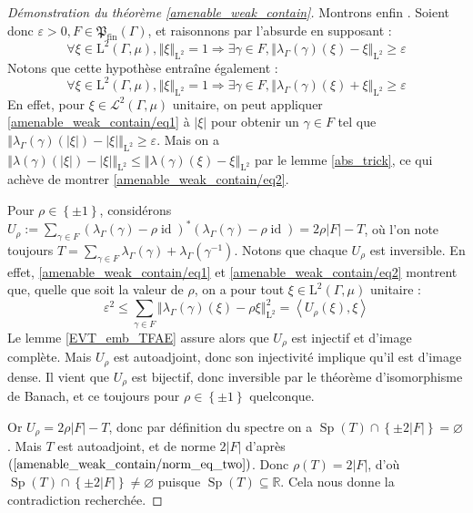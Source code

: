 \documentclass[a4paper,12pt]{article}
\newcommand{\R}{\mathbb{R}}
\newcommand{\norm}[1]{\left\Vert #1\right\Vert}
\newcommand{\abs}[1]{\left\vert#1\right\vert}
\newcommand{\card}[1]{\abs{#1}}
\newcommand{\ket}[1]{\left\langle #1 \right\rangle}
\newcommand{\set}[1]{\left\{ #1 \right\}}
\newcommand{\inv}{^{-1}}
\renewcommand{\implies}{\Rightarrow}
\newcommand{\finparts}{\mathfrak{P}_{\mathrm{fin}}}
\DeclareMathOperator{\id}{id}
\DeclareMathOperator{\Sp}{Sp}
\begin{document}
\begin{proof}[Démonstration du théorème \ref{amenable_weak_contain}]
    Montrons enfin \framebox{$(\ref{amenable_weak_contain/norm_eq_two})\implies(\ref{amenable_weak_contain/weak_almost_invariant})$}. Soient donc $\varepsilon>0, F\in\finparts(\Gamma)$, et 
    raisonnons par l'absurde en supposant :
    \begin{equation}\label{amenable_weak_contain/eq1}
        \forall\xi\in\mathrm{L}^2(\Gamma, \mu), \norm{\xi}_{\mathrm{L}^2} = 1\implies \exists\gamma\in F, \norm{\lambda_\Gamma(\gamma)(\xi) - \xi}_{\mathrm{L}^2}\geq\varepsilon
    \end{equation}
    Notons que cette hypothèse entraîne également :
    \begin{equation}\label{amenable_weak_contain/eq2}
        \forall\xi\in\mathrm{L}^2(\Gamma, \mu), \norm{\xi}_{\mathrm{L}^2} = 1\implies \exists\gamma\in F, \norm{\lambda_\Gamma(\gamma)(\xi) + \xi}_{\mathrm{L}^2}\geq\varepsilon
    \end{equation}
    En effet, pour $\xi\in\mathscr{L}^2(\Gamma, \mu)$ unitaire, on peut appliquer \eqref{amenable_weak_contain/eq1} à $\abs\xi$ pour obtenir un $\gamma\in F$ tel que $\norm{\lambda_\Gamma(\gamma)(\abs\xi) - \abs\xi}_{\mathrm{L}^2}\geq\varepsilon$.
    Mais on a $\norm{\lambda(\gamma)(\abs{\xi}) - \abs{\xi}}_{\mathrm{L}^2} \le \norm{\lambda(\gamma)(\xi) - \xi}_{\mathrm{L}^2}$ par le lemme \ref{abs_trick}, ce qui achève de montrer \eqref{amenable_weak_contain/eq2}.

    Pour $\rho\in\set{\pm1}$, considérons $U_\rho := \sum_{\gamma\in F}(\lambda_\Gamma(\gamma) - \rho\id)^*(\lambda_\Gamma(\gamma) - \rho\id) = 2\rho\card{F} - T$, 
    où l'on note toujours $T = \sum_{\gamma\in F}\lambda_\Gamma(\gamma) + \lambda_\Gamma(\gamma\inv)$. Notons que chaque $U_\rho$ est inversible. 
    En effet, \eqref{amenable_weak_contain/eq1} et \eqref{amenable_weak_contain/eq2} montrent que, quelle que soit la valeur de $\rho$, 
    on a pour tout $\xi\in\mathrm{L}^2(\Gamma, \mu)$ unitaire :
    \begin{equation*}
        \varepsilon^2\leq\sum_{\gamma\in F}\norm{\lambda_\Gamma(\gamma)(\xi) - \rho\xi}_{\mathrm{L}^2}^2 = \ket{U_\rho(\xi), \xi}
    \end{equation*}
    Le lemme \ref{EVT_emb_TFAE} assure alors que $U_\rho$ est injectif et d'image complète. Mais $U_\rho$ est autoadjoint, donc 
    son injectivité implique qu'il est d'image dense. Il vient que $U_\rho$ est bijectif, donc inversible par le théorème d'isomorphisme de Banach,
    et ce toujours pour $\rho\in\set{\pm1}$ quelconque.

    Or $U_\rho = 2\rho\card{F} - T$, donc par définition du spectre on a $\Sp(T)\cap\set{\pm2\card{F}}=\varnothing$. Mais $T$ est autoadjoint,
    et de norme $2\card{F}$ d'après $(\ref{amenable_weak_contain/norm_eq_two})$. Donc $\rho(T) = 2\card{F}$, d'où $\Sp(T)\cap\set{\pm2\card{F}}\neq\varnothing$
    puisque $\Sp(T)\subseteq\R$. Cela nous donne la contradiction recherchée.


\end{proof}
\end{document}
